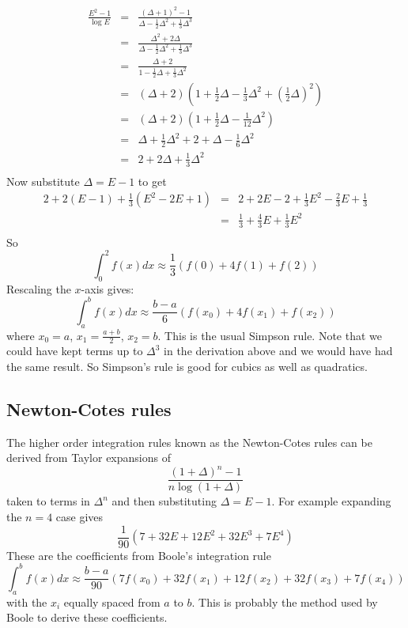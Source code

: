 \documentclass[a4paper]{article}
\theoremstyle{definition}
\begin{document}
\begin{eqnarray*}
\frac{E^2-1}{\log E}
& = & \frac{(\Delta+1)^2-1}{\Delta-\frac{1}{2}\Delta^2+\frac{1}{3}\Delta^3} \\
& = & \frac{\Delta^2+2\Delta}{\Delta-\frac{1}{2}\Delta^2+\frac{1}{3}\Delta^3} \\
& = & \frac{\Delta+2}{1-\frac{1}{2}\Delta+\frac{1}{3}\Delta^2} \\
& = & (\Delta+2)(1+\frac{1}{2}\Delta-\frac{1}{3}\Delta^2+(\frac{1}{2}\Delta)^2) \\
& = & (\Delta+2)(1+\frac{1}{2}\Delta-\frac{1}{12}\Delta^2) \\
& = & \Delta+\frac{1}{2}\Delta^2+2+\Delta-\frac{1}{6}\Delta^2 \\
& = & 2+2\Delta+\frac{1}{3}\Delta^2 \\
\end{eqnarray*}
Now substitute $\Delta=E-1$ to get
\begin{eqnarray*}
2+2(E-1)+\frac{1}{3}(E^2-2E+1) & = &2+2E-2+\frac{1}{3}E^2-\frac{2}{3}E+\frac{1}{3} \\
& = & \frac{1}{3}+\frac{4}{3}E+\frac{1}{3}E^2 \\
\end{eqnarray*}
So
\[
\int_0^2f(x)dx \approx \frac{1}{3}(f(0)+4f(1)+f(2))
\]
Rescaling the $x$-axis gives:
\[
\int_a^bf(x)dx \approx \frac{b-a}{6}(f(x_0)+4f(x_1)+f(x_2))
\]
where $x_0=a$, $x_1=\frac{a+b}{2}$, $x_2=b$.
This is the usual Simpson rule.
Note that we could have kept terms up to $\Delta^3$ in the derivation above and we would have had the same result.
So Simpson's rule is good for cubics as well as quadratics.

\subsection{Newton-Cotes rules}
The higher order integration rules known as the Newton-Cotes rules can be derived from Taylor expansions of
\[
\frac{(1+\Delta)^n-1}{n\log(1+\Delta)}
\]
taken to terms in $\Delta^n$ and then substituting $\Delta=E-1$.
For example expanding the $n=4$ case gives
\[
\frac{1}{90}(7+32E+12E^2+32E^3+7E^4)
\]
These are the coefficients from Boole's integration rule
\[
\int_a^bf(x)dx \approx \frac{b-a}{90}(7f(x_0)+32f(x_1)+12f(x_2)+32f(x_3)+7f(x_4))
\]
with the $x_i$ equally spaced from $a$ to $b$.
This is probably the method used by Boole to derive these coefficients.
\end{document}
